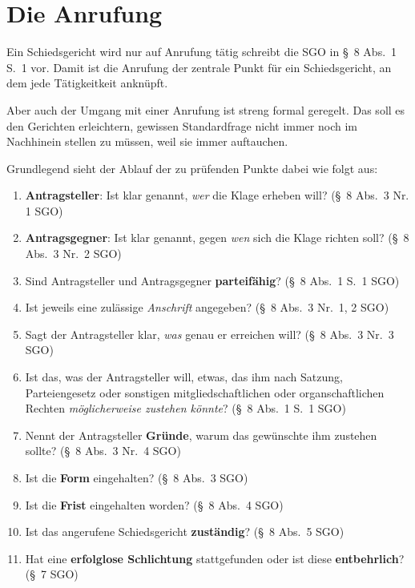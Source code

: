 
\chapter{Die Anrufung}
\label{Anrufung}
Ein Schiedsgericht wird nur auf Anrufung tätig schreibt die SGO in \S~8 Abs.~1 S.~1 vor.
Damit ist die Anrufung der zentrale Punkt für ein Schiedsgericht, an dem jede Tätigkeitkeit anknüpft.

Aber auch der Umgang mit einer Anrufung ist streng formal geregelt.
Das soll es den Gerichten erleichtern, gewissen Standardfrage nicht immer noch im Nachhinein stellen zu müssen, weil sie immer auftauchen.

Grundlegend sieht der Ablauf der zu prüfenden Punkte dabei wie folgt aus:
\begin{enumerate}[label=\Roman*.]
\item \textbf{Antragsteller}: Ist klar genannt, \emph{wer} die Klage erheben will? (\S~8 Abs.~3 Nr. 1 SGO)
\item \textbf{Antragsgegner}: Ist klar genannt, gegen \emph{wen} sich die Klage richten soll? (\S~8 Abs.~3 Nr.~2 SGO)
\item Sind Antragsteller und Antragsgegner \textbf{parteifähig}? (\S~8 Abs.~1 S.~1 SGO)
\item Ist jeweils eine zulässige \emph{Anschrift} angegeben? (\S~8 Abs.~3 Nr.~1, 2 SGO)
\item Sagt der Antragsteller klar, \emph{was} genau er erreichen will? (\S~8 Abs.~3 Nr.~3 SGO)
\item Ist das, was der Antragsteller will, etwas, das ihm nach Satzung, Parteiengesetz oder sonstigen mitgliedschaftlichen oder organschaftlichen Rechten \emph{möglicherweise zustehen könnte}? (\S~8 Abs.~1 S.~1 SGO)
\item Nennt der Antragsteller \textbf{Gründe}, warum das gewünschte ihm zustehen sollte? (\S~8 Abs.~3 Nr.~4 SGO)
\item Ist die \textbf{Form} eingehalten? (\S~8 Abs.~3 SGO)
\item Ist die \textbf{Frist} eingehalten worden? (\S~8 Abs.~4 SGO)
\item Ist das angerufene Schiedsgericht \textbf{zuständig}? (\S~8 Abs.~5 SGO)
\item Hat eine \textbf{erfolglose Schlichtung} stattgefunden oder ist diese \textbf{entbehrlich}? (\S~7 SGO)
\end{enumerate}

